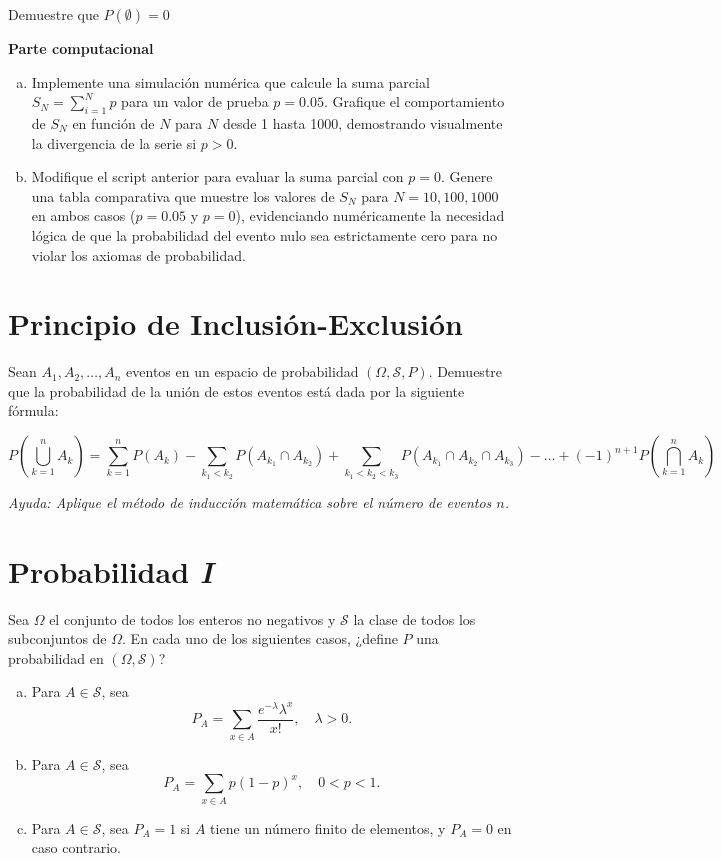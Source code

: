 \documentclass[a4paper]{article}
\begin{document}
Demuestre que $P(\emptyset) = 0$

\textbf{Parte computacional}
\begin{enumerate}[a)]
\item Implemente una simulación numérica que calcule la suma parcial $S_N = \sum_{i=1}^{N} p$ para un valor de prueba $p = 0.05$. Grafique el comportamiento de $S_N$ en función de $N$ para $N$ desde 1 hasta 1000, demostrando visualmente la divergencia de la serie si $p > 0$.
\item Modifique el script anterior para evaluar la suma parcial con $p = 0$. Genere una tabla comparativa que muestre los valores de $S_N$ para $N = 10, 100, 1000$ en ambos casos ($p = 0.05$ y $p = 0$), evidenciando numéricamente la necesidad lógica de que la probabilidad del evento nulo sea estrictamente cero para no violar los axiomas de probabilidad.
\end{enumerate}


\section{Principio de Inclusión-Exclusión}
\label{sec:problema-08}

Sean $A_1, A_2, \dots, A_n$ eventos en un espacio de probabilidad $(\Omega, \mathcal{S}, P)$. Demuestre que la probabilidad de la unión de estos eventos está dada por la siguiente fórmula:

$$ P\left(\bigcup_{k=1}^n A_k\right) = \sum_{k=1}^n P(A_k) - \sum_{k_1 < k_2} P(A_{k_1} \cap A_{k_2}) + \sum_{k_1 < k_2 < k_3} P(A_{k_1} \cap A_{k_2} \cap A_{k_3}) - \dots + (-1)^{n+1} P\left(\bigcap_{k=1}^n A_k\right) $$

\textit{Ayuda: Aplique el método de inducción matemática sobre el número de eventos $n$.}

\section{Probabilidad \textit{I}}
\label{sec:problema-09}

Sea $\Omega$ el conjunto de todos los enteros no negativos y $\mathcal{S}$ la clase de todos los subconjuntos de $\Omega$. En cada uno de los siguientes casos, ¿define $P$ una probabilidad en $(\Omega, \mathcal{S})$?

\begin{enumerate}[a)]
    \item Para $A \in \mathcal{S}$, sea
    $$P_A = \sum_{x \in A} \frac{e^{-\lambda} \lambda^x}{x!}, \quad \lambda > 0.$$
    \item Para $A \in \mathcal{S}$, sea
    $$P_A = \sum_{x \in A} p(1-p)^x, \quad 0 < p < 1.$$
    \item Para $A \in \mathcal{S}$, sea $P_A = 1$ si $A$ tiene un número finito de elementos, y $P_A = 0$ en caso contrario.
\end{enumerate}
\end{document}
